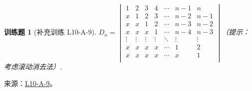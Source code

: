 \documentclass[UTF8,12pt,a4paper,fontset=fandol]{ctexart}
\newtheorem{exercise}{训练题}[section]
\begin{document}
\begin{exercise}[补充训练 L10-A-9]\label{prob:L10-A-9}
$ D_n=\begin{vmatrix}
                1      & 2      & 3      & 4      & \cdots & n-1    & n      \\
                x      & 1      & 2      & 3      & \cdots & n-2    & n-1    \\
                x      & x      & 1      & 2      & \cdots & n-3    & n-2    \\
                x      & x      & x      & 1      & \cdots & n-4    & n-3    \\
                \vdots & \vdots & \vdots & \vdots & \ddots & \vdots & \vdots \\
                x      & x      & x      & x      & \cdots & 1      & 2      \\
                x      & x      & x      & x      & \cdots & x      & 1      \\
            \end{vmatrix}$（提示：考虑滚动消去法）.
\end{exercise}
\noindent 来源：\href{https://github.com/yhwu-is/Linear-Algebra-Left-Undone/blob/new/%E8%AE%B2%E4%B9%89/%E4%B8%93%E9%A2%98/10%20%E8%A1%8C%E5%88%97%E5%BC%8F.tex}{L10-A-9}。
\end{document}

